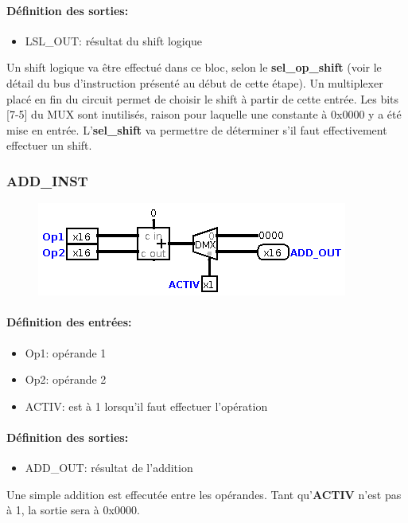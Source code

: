 \documentclass[a4paper]{article} %
\begin{document}
\paragraph{Définition des sorties:}
\begin{itemize}
    \item     LSL\_OUT: résultat du shift logique
\end{itemize}
\medskip
Un shift logique va être effectué dans ce bloc, selon le \textbf{sel\_op\_shift} (voir le détail du bus d'instruction présenté au début de cette étape). Un multiplexer placé en fin du circuit permet de choisir le shift à partir de cette entrée. Les bits [7-5] du MUX sont inutilisés, raison pour laquelle une constante à 0x0000 y a été mise en entrée. L'\textbf{sel\_shift} va permettre de déterminer s'il faut effectivement effectuer un shift.

\subsubsection{ADD\_INST}
\begin{figure}[H]
    \centering
    \includegraphics[width=.8\textwidth]{src/ADD_INST.png}
    \label{fig:add_inst_pic}
\end{figure}
\paragraph{Définition des entrées:}
\begin{itemize}
    \item     Op1: opérande 1
    \item     Op2: opérande 2
    \item     ACTIV: est à 1 lorsqu'il faut effectuer l'opération
\end{itemize}

\paragraph{Définition des sorties:}
\begin{itemize}
    \item     ADD\_OUT: résultat de l'addition
\end{itemize}
\medskip
Une simple addition est effecutée entre les opérandes. Tant qu'\textbf{ACTIV} n'est pas à 1, la sortie sera à 0x0000.
\end{document}
